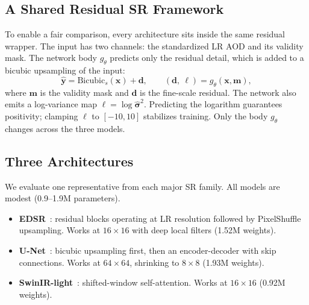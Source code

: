 \documentclass[conference]{IEEEtran}
\begin{document}
\subsection{A Shared Residual SR Framework}
To enable a fair comparison, every architecture sits inside the same residual wrapper. The input has two channels: the standardized LR AOD and its validity mask. The network body \(g_\theta\) predicts only the residual detail, which is added to a bicubic upsampling of the input:
\begin{equation}
\hat{\mathbf{y}} = \mathrm{Bicubic}_s(\mathbf{x}) + \mathbf{d},\qquad (\mathbf{d},\ \boldsymbol{\ell}) = g_\theta(\mathbf{x},\mathbf{m}),
\end{equation}
where \(\mathbf{m}\) is the validity mask and \(\mathbf{d}\) is the fine-scale residual. The network also emits a log-variance map \(\boldsymbol{\ell}=\log\hat{\boldsymbol{\sigma}}^2\). Predicting the logarithm guarantees positivity; clamping \(\boldsymbol{\ell}\) to \([-10,10]\) stabilizes training. Only the body \(g_\theta\) changes across the three models.
\subsection{Three Architectures}
We evaluate one representative from each major SR family. All models are modest (0.9--1.9M parameters).
\begin{itemize}
\item \textbf{EDSR}~\cite{lim2017edsr}: residual blocks operating at LR resolution followed by PixelShuffle upsampling. Works at \(16\times16\) with deep local filters (1.52M weights).
\item \textbf{U-Net}~\cite{ronneberger2015unet}: bicubic upsampling first, then an encoder-decoder with skip connections. Works at \(64\times64\), shrinking to \(8\times8\) (1.93M weights).
\item \textbf{SwinIR-light}~\cite{liang2021swinir}: shifted-window self-attention. Works at \(16\times16\) (0.92M weights).
\end{itemize}
\end{document}
